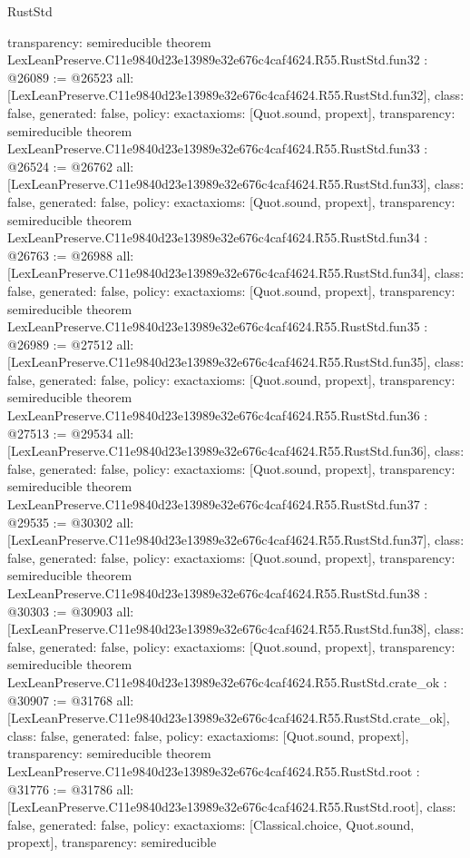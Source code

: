 \begin{lexlean}{RustStd}
\begin{coremodule}
{  transparency: semireducible
}
theorem LexLeanPreserve.C11e9840d23e13989e32e676c4caf4624.R55.RustStd.fun32 : @26089 := @26523 {
  all: [LexLeanPreserve.C11e9840d23e13989e32e676c4caf4624.R55.RustStd.fun32],
  class: false,
  generated: false,
  policy: exact{axioms: [Quot.sound, propext]},
  transparency: semireducible
}
theorem LexLeanPreserve.C11e9840d23e13989e32e676c4caf4624.R55.RustStd.fun33 : @26524 := @26762 {
  all: [LexLeanPreserve.C11e9840d23e13989e32e676c4caf4624.R55.RustStd.fun33],
  class: false,
  generated: false,
  policy: exact{axioms: [Quot.sound, propext]},
  transparency: semireducible
}
theorem LexLeanPreserve.C11e9840d23e13989e32e676c4caf4624.R55.RustStd.fun34 : @26763 := @26988 {
  all: [LexLeanPreserve.C11e9840d23e13989e32e676c4caf4624.R55.RustStd.fun34],
  class: false,
  generated: false,
  policy: exact{axioms: [Quot.sound, propext]},
  transparency: semireducible
}
theorem LexLeanPreserve.C11e9840d23e13989e32e676c4caf4624.R55.RustStd.fun35 : @26989 := @27512 {
  all: [LexLeanPreserve.C11e9840d23e13989e32e676c4caf4624.R55.RustStd.fun35],
  class: false,
  generated: false,
  policy: exact{axioms: [Quot.sound, propext]},
  transparency: semireducible
}
theorem LexLeanPreserve.C11e9840d23e13989e32e676c4caf4624.R55.RustStd.fun36 : @27513 := @29534 {
  all: [LexLeanPreserve.C11e9840d23e13989e32e676c4caf4624.R55.RustStd.fun36],
  class: false,
  generated: false,
  policy: exact{axioms: [Quot.sound, propext]},
  transparency: semireducible
}
theorem LexLeanPreserve.C11e9840d23e13989e32e676c4caf4624.R55.RustStd.fun37 : @29535 := @30302 {
  all: [LexLeanPreserve.C11e9840d23e13989e32e676c4caf4624.R55.RustStd.fun37],
  class: false,
  generated: false,
  policy: exact{axioms: [Quot.sound, propext]},
  transparency: semireducible
}
theorem LexLeanPreserve.C11e9840d23e13989e32e676c4caf4624.R55.RustStd.fun38 : @30303 := @30903 {
  all: [LexLeanPreserve.C11e9840d23e13989e32e676c4caf4624.R55.RustStd.fun38],
  class: false,
  generated: false,
  policy: exact{axioms: [Quot.sound, propext]},
  transparency: semireducible
}
theorem LexLeanPreserve.C11e9840d23e13989e32e676c4caf4624.R55.RustStd.crate_ok : @30907 := @31768 {
  all: [LexLeanPreserve.C11e9840d23e13989e32e676c4caf4624.R55.RustStd.crate_ok],
  class: false,
  generated: false,
  policy: exact{axioms: [Quot.sound, propext]},
  transparency: semireducible
}
theorem LexLeanPreserve.C11e9840d23e13989e32e676c4caf4624.R55.RustStd.root : @31776 := @31786 {
  all: [LexLeanPreserve.C11e9840d23e13989e32e676c4caf4624.R55.RustStd.root],
  class: false,
  generated: false,
  policy: exact{axioms: [Classical.choice, Quot.sound, propext]},
  transparency: semireducible
}


\end{coremodule}
\end{lexlean}
